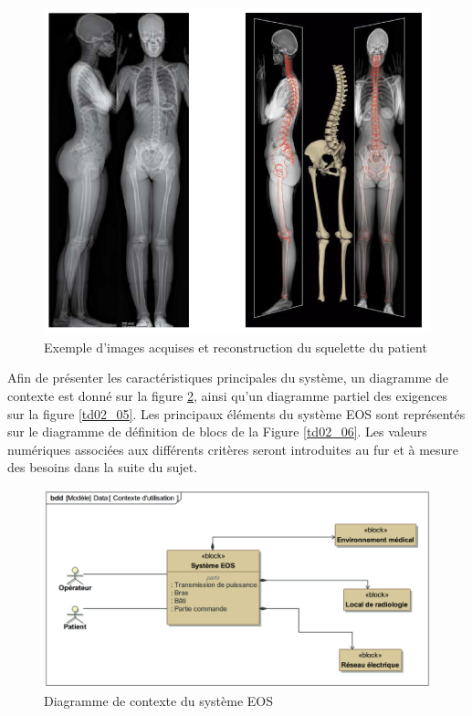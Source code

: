 \begin{figure}[!h]
 \centering \includegraphics[width=0.8\linewidth]{img/td02_03}
 \caption{Exemple d'images acquises et reconstruction du squelette du patient}
 \label{td02_03}
\end{figure}

Afin de présenter les caractéristiques principales du système, un diagramme de contexte est donné sur la
figure \ref{td02_04}, ainsi qu'un diagramme partiel des exigences sur la figure \ref{td02_05}. Les principaux éléments du système EOS sont représentés sur le diagramme de définition de blocs de la Figure \ref{td02_06}. Les valeurs numériques associées aux différents critères seront introduites au fur et à mesure des besoins dans la suite du sujet.

\begin{figure}[!h]
 \centering \includegraphics[width=0.8\linewidth]{img/td02_04}
 \caption{Diagramme de contexte du système EOS}
 \label{td02_04}
\end{figure}


